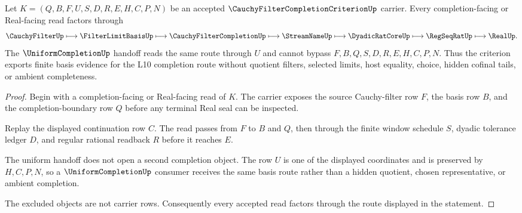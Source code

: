 \begin{theorem}
\label{thm:cauchy-filter-completion-criterion-basis-route}
Let $K=(Q,B,F,U,S,D,R,E,H,C,P,N)$ be an accepted $\CauchyFilterCompletionCriterionUp$ carrier. Every completion-facing or Real-facing read factors through
$$
\CauchyFilterUp \longmapsto \FilterLimitBasisUp \longmapsto \CauchyFilterCompletionUp \longmapsto \StreamNameUp \longmapsto \DyadicRatCoreUp \longmapsto \RegSeqRatUp \longmapsto \RealUp .
$$
The $\UniformCompletionUp$ handoff reads the same route through $U$ and cannot bypass $F,B,Q,S,D,R,E,H,C,P,N$. Thus the criterion exports finite basis evidence for the L10 completion route without quotient filters, selected limits, host equality, choice, hidden cofinal tails, or ambient completeness.
\end{theorem}
\begin{proof}
Begin with a completion-facing or Real-facing read of $K$. The carrier exposes the source Cauchy-filter row $F$, the basis row $B$, and the completion-boundary row $Q$ before any terminal Real seal can be inspected.

Replay the displayed continuation row $C$. The read passes from $F$ to $B$ and $Q$, then through the finite window schedule $S$, dyadic tolerance ledger $D$, and regular rational readback $R$ before it reaches $E$.

The uniform handoff does not open a second completion object. The row $U$ is one of the displayed coordinates and is preserved by $H,C,P,N$, so a $\UniformCompletionUp$ consumer receives the same basis route rather than a hidden quotient, chosen representative, or ambient completion.

The excluded objects are not carrier rows. Consequently every accepted read factors through the route displayed in the statement.
\end{proof}

